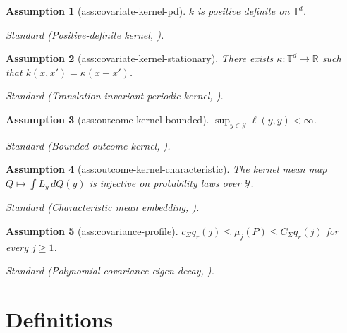 \documentclass{article}
\newtheorem{assumption}{Assumption}
\begin{document}
\begin{assumption}[ass:covariate-kernel-pd]\label{ass:covariate-kernel-pd}
\(k\) is positive definite on \(\mathbb T^d\).
\par\smallskip\noindent\emph{Standard} (Positive-definite kernel, \cite{GrettonEtAl2012KernelTwoSample}).
\end{assumption}

\begin{assumption}[ass:covariate-kernel-stationary]\label{ass:covariate-kernel-stationary}
There exists \(\kappa:\mathbb T^d\to\mathbb R\) such that \(k(x,x')=\kappa(x-x')\).
\par\smallskip\noindent\emph{Standard} (Translation-invariant periodic kernel, \cite{HagrassSriperumbudurLi2024SR2T}).
\end{assumption}

\begin{assumption}[ass:outcome-kernel-bounded]\label{ass:outcome-kernel-bounded}
\(\sup_{y\in\mathcal Y}\ell(y,y)<\infty\).
\par\smallskip\noindent\emph{Standard} (Bounded outcome kernel, \cite{GrettonEtAl2012KernelTwoSample}).
\end{assumption}

\begin{assumption}[ass:outcome-kernel-characteristic]\label{ass:outcome-kernel-characteristic}
The kernel mean map \(Q\mapsto\int L_y\,dQ(y)\) is injective on probability laws over \(\mathcal Y\).
\par\smallskip\noindent\emph{Standard} (Characteristic mean embedding, \cite{GrettonEtAl2012KernelTwoSample}).
\end{assumption}

\begin{assumption}[ass:covariance-profile]\label{ass:covariance-profile}
\(c_\Sigma q_r(j)\le\mu_j(P)\le C_\Sigma q_r(j)\) for every \(j\ge1\).
\par\smallskip\noindent\emph{Standard} (Polynomial covariance eigen-decay, \cite{HagrassSriperumbudurLi2024SR2T}).
\end{assumption}

\section{Definitions}
\end{document}
